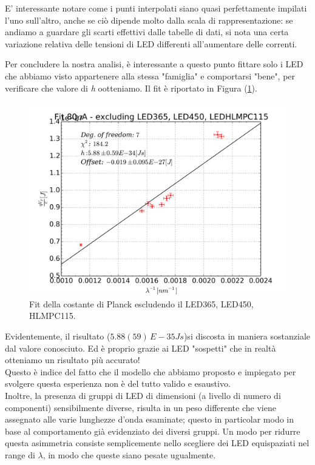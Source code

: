 \documentclass[journal, a4paper]{IEEEtran}
\begin{document}
E' interessante notare come i punti interpolati siano quasi perfettamente impilati l'uno sull'altro, anche se ciò dipende molto dalla scala di rappresentazione: se andiamo a guardare gli scarti effettivi dalle tabelle di dati, si nota una certa variazione relativa delle tensioni di LED differenti all'aumentare delle correnti.

Per concludere la nostra analisi, è interessante a questo punto fittare solo i LED che abbiamo visto appartenere alla stessa "famiglia" e comportarsi "bene", per verificare che valore di \textit{h} ootteniamo. Il fit è riportato in Figura (\ref{fig:costante_planck_80ua_exclud1}).

\begin{figure}
\centering
\includegraphics[width=0.9\linewidth]{./costante_planck_80ua_exclud1}
\caption{Fit della costante di Planck escludendo il LED365, LED450, HLMPC115.}
\label{fig:costante_planck_80ua_exclud1}
\end{figure}

Evidentemente, il risultato ($5.88(59) \, E-35 \si{Js}$)si discosta in maniera sostanziale dal valore conosciuto. Ed è proprio grazie ai LED "sospetti" che in realtà otteniamo un risultato più accurato! \\
Questo è indice del fatto che il modello che abbiamo proposto e impiegato per svolgere questa esperienza non è del tutto valido e esaustivo. \\
Inoltre, la presenza di gruppi di LED di dimensioni (a livello di numero di componenti) sensibilmente diverse, risulta in un peso differente che viene assegnato alle varie lunghezze d'onda esaminate; questo in particolar modo in base al comportamento già evidenziato dei diversi gruppi. Un modo per ridurre questa asimmetria consiste semplicemente nello scegliere dei LED equispaziati nel range di $\lambda$, in modo che queste siano pesate ugualmente.
\end{document}
